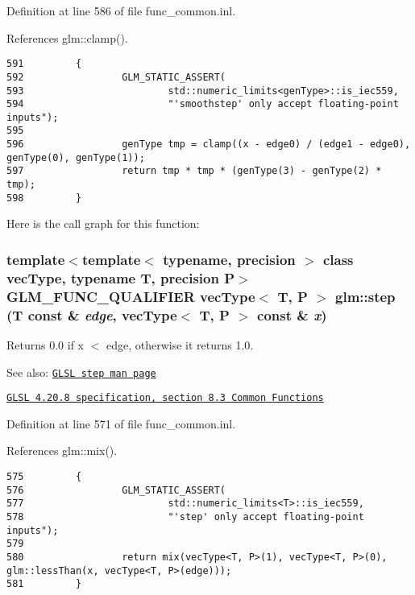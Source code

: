 Definition at line 586 of file func\_\-common.inl.

References glm::clamp().

\begin{Code}\begin{verbatim}591         {
592                 GLM_STATIC_ASSERT(
593                         std::numeric_limits<genType>::is_iec559,
594                         "'smoothstep' only accept floating-point inputs");
595 
596                 genType tmp = clamp((x - edge0) / (edge1 - edge0), genType(0), genType(1));
597                 return tmp * tmp * (genType(3) - genType(2) * tmp);
598         }
\end{verbatim}
\end{Code}




Here is the call graph for this function:\hypertarget{group__core__func__common_gdb27417a05ff516eda338a7047cea913}{
\subsubsection[step]{\setlength{\rightskip}{0pt plus 5cm}template$<$template$<$ typename, precision $>$ class vecType, typename T, precision P$>$ GLM\_\-FUNC\_\-QUALIFIER vecType$<$ T, P $>$ glm::step (T const \& {\em edge}, \/  vecType$<$ T, P $>$ const \& {\em x})}}
\label{group__core__func__common_gdb27417a05ff516eda338a7047cea913}


Returns 0.0 if x $<$ edge, otherwise it returns 1.0.

\begin{Desc}
\item[See also:]\href{http://www.opengl.org/sdk/docs/manglsl/xhtml/step.xml}{\tt GLSL step man page} 

\href{http://www.opengl.org/registry/doc/GLSLangSpec.4.20.8.pdf}{\tt GLSL 4.20.8 specification, section 8.3 Common Functions} \end{Desc}


Definition at line 571 of file func\_\-common.inl.

References glm::mix().

\begin{Code}\begin{verbatim}575         {
576                 GLM_STATIC_ASSERT(
577                         std::numeric_limits<T>::is_iec559,
578                         "'step' only accept floating-point inputs");
579 
580                 return mix(vecType<T, P>(1), vecType<T, P>(0), glm::lessThan(x, vecType<T, P>(edge)));
581         }
\end{verbatim}
\end{Code}




